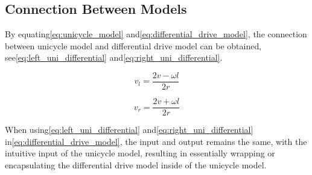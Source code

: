 
\subsection{Connection Between Models}

By equating\:\eqref{eq:unicycle_model} and\:\eqref{eq:differential_drive_model}, the connection between unicycle model and differential drive model can be obtained, see\:\eqref{eq:left_uni_differential} and\:\eqref{eq:right_uni_differential}\:\cite{carlenerikssonLectureKinematicsBehavioral2024}.

\begin{dmath}
    \label{eq:left_uni_differential}
    v_l = \frac{2 v - \omega l}{2 r}
\end{dmath}

\begin{dmath}
    \label{eq:right_uni_differential}
    v_r = \frac{2 v + \omega l}{2 r}
\end{dmath}

When using\:\eqref{eq:left_uni_differential} and\:\eqref{eq:right_uni_differential} in\:\eqref{eq:differential_drive_model}, the input and output remains the same, with the intuitive input of the unicycle model, resulting in essentially wrapping or encapsulating the differential drive model inside of the unicycle model.



\begin{comment}
    
\end{comment}
